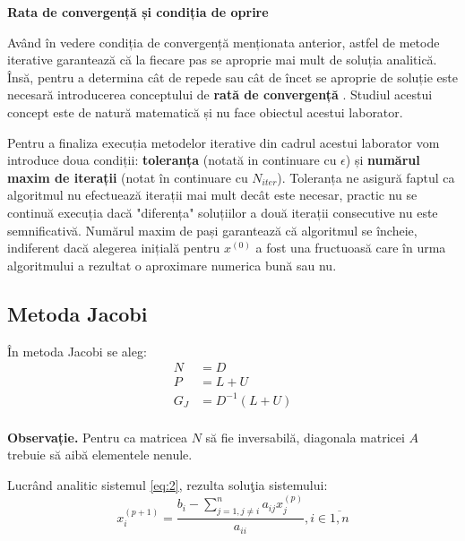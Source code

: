 \documentclass{exam}
\theoremstyle{definition}
\begin{document}
\textbf{Rata de convergență și condiția de oprire}

\par Având în vedere condiția de convergență menționata anterior, astfel de metode iterative garantează că la fiecare pas se aproprie mai mult de soluția analitică. Însă, pentru a determina cât de repede sau cât de încet se aproprie de soluție este necesară introducerea conceptului de \textbf{rată de convergență} \cite{Gallier}. Studiul acestui concept este de natură matematică și nu face obiectul acestui laborator. 

\par Pentru a finaliza execuția metodelor iterative din cadrul acestui laborator vom introduce doua condiții: \textbf{toleranța} (notată in continuare cu \(\epsilon\)) și \textbf{numărul maxim de iterații} (notat în continuare cu \(N_{iter}\)). Toleranța ne asigură faptul ca algoritmul nu efectuează iterații mai mult decât este necesar, practic nu se continuă execuția dacă "diferența" soluțiilor a două iterații consecutive nu este semnificativă. Numărul maxim de pași garantează că algoritmul se încheie, indiferent dacă alegerea inițială pentru \(x^{(0)}\) a fost una fructuoasă care în urma algoritmului a rezultat o aproximare numerica bună sau nu.


\subsection{Metoda Jacobi}
\par \^{I}n metoda Jacobi se aleg:
\begin{align*}
N &= D \\
P &= L + U \\
{G}_{J} &= {D}^{-1}(L + U) \\
\end{align*}

\par \textbf{Observație.} Pentru ca matricea $N$ să fie inversabilă, diagonala matricei $A$ trebuie să aibă elementele nenule.

\par Lucrând analitic sistemul \ref{eq:2}, rezulta solu\c{t}ia sistemului:
$${x}_{i}^{(p+1)} = \frac{{b}_{i} - \sum_{j = 1, j \neq i}^{n}{a}_{ij}{x}_{j}^{(p)}}{{a}_{ii}}, i\in\overline{1, n}$$

\end{document}
